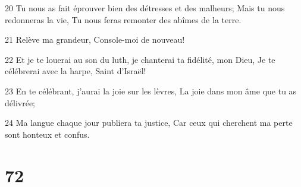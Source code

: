 \par 20 Tu nous as fait éprouver bien des détresses et des malheurs; Mais tu nous redonneras la vie, Tu nous feras remonter des abîmes de la terre.
\par 21 Relève ma grandeur, Console-moi de nouveau!
\par 22 Et je te louerai au son du luth, je chanterai ta fidélité, mon Dieu, Je te célébrerai avec la harpe, Saint d'Israël!
\par 23 En te célébrant, j'aurai la joie sur les lèvres, La joie dans mon âme que tu as délivrée;
\par 24 Ma langue chaque jour publiera ta justice, Car ceux qui cherchent ma perte sont honteux et confus.

\chapter{72}

